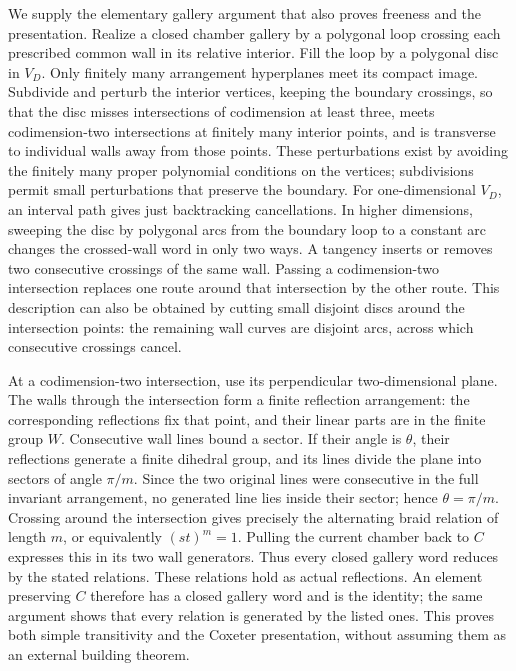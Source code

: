 \documentclass[
  11pt,
]{article}
\begin{document}
We supply the elementary gallery argument that also proves freeness and
the presentation. Realize a closed chamber gallery by a polygonal loop
crossing each prescribed common wall in its relative interior. Fill the
loop by a polygonal disc in \(V_D\). Only finitely many arrangement
hyperplanes meet its compact image. Subdivide and perturb the interior
vertices, keeping the boundary crossings, so that the disc misses
intersections of codimension at least three, meets codimension-two
intersections at finitely many interior points, and is transverse to
individual walls away from those points. These perturbations exist by
avoiding the finitely many proper polynomial conditions on the vertices;
subdivisions permit small perturbations that preserve the boundary. For
one-dimensional \(V_D\), an interval path gives just backtracking
cancellations. In higher dimensions, sweeping the disc by polygonal arcs
from the boundary loop to a constant arc changes the crossed-wall word
in only two ways. A tangency inserts or removes two consecutive
crossings of the same wall. Passing a codimension-two intersection
replaces one route around that intersection by the other route. This
description can also be obtained by cutting small disjoint discs around
the intersection points: the remaining wall curves are disjoint arcs,
across which consecutive crossings cancel.

At a codimension-two intersection, use its perpendicular two-dimensional
plane. The walls through the intersection form a finite reflection
arrangement: the corresponding reflections fix that point, and their
linear parts are in the finite group \(W\). Consecutive wall lines bound
a sector. If their angle is \(\theta\), their reflections generate a
finite dihedral group, and its lines divide the plane into sectors of
angle \(\pi/m\). Since the two original lines were consecutive in the
full invariant arrangement, no generated line lies inside their sector;
hence \(\theta=\pi/m\). Crossing around the intersection gives precisely
the alternating braid relation of length \(m\), or equivalently
\((st)^m=1\). Pulling the current chamber back to \(C\) expresses this
in its two wall generators. Thus every closed gallery word reduces by
the stated relations. These relations hold as actual reflections. An
element preserving \(C\) therefore has a closed gallery word and is the
identity; the same argument shows that every relation is generated by
the listed ones. This proves both simple transitivity and the Coxeter
presentation, without assuming them as an external building theorem.
\end{document}
